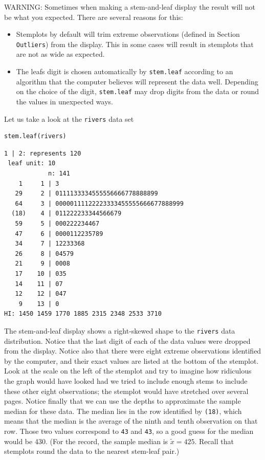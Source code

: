 \documentclass[10pt,english]{scrbook}
\begin{document}
WARNING: Sometimes when making a stem-and-leaf display the result will not be what you expected. There are several reasons for this: 
\begin{itemize}
\item Stemplots by default will trim extreme observations (defined in Section \texttt{Outliers}) from the display. This in some cases will result in stemplots that are not as wide as expected.
\item The leafs digit is chosen automatically by \texttt{stem.leaf} according to an algorithm that the computer believes will represent the data well. Depending on the choice of the digit, \texttt{stem.leaf} may drop digits from the data or round the values in unexpected ways.
\end{itemize}

Let us take a look at the \texttt{rivers} data set

\begin{verbatim}
stem.leaf(rivers)
\end{verbatim}

\begin{verbatim}
1 | 2: represents 120
 leaf unit: 10
            n: 141
    1     1 | 3
   29     2 | 0111133334555556666778888899
   64     3 | 00000111122223333455555666677888999
  (18)    4 | 011222233344566679
   59     5 | 000222234467
   47     6 | 0000112235789
   34     7 | 12233368
   26     8 | 04579
   21     9 | 0008
   17    10 | 035
   14    11 | 07
   12    12 | 047
    9    13 | 0
HI: 1450 1459 1770 1885 2315 2348 2533 3710
\end{verbatim}

The stem-and-leaf display shows a right-skewed shape to the \texttt{rivers} data distribution. Notice that the last digit of each of the data values were dropped from the display. Notice also that there were eight extreme observations identified by the computer, and their exact values are listed at the bottom of the stemplot. Look at the scale on the left of the stemplot and try to imagine how ridiculous the graph would have looked had we tried to include enough stems to include these other eight observations; the stemplot would have stretched over several pages. Notice finally that we can use the depths to approximate the sample median for these data. The median lies in the row identified by \texttt{(18)}, which means that the median is the average of the ninth and tenth observation on that row. Those two values correspond to \texttt{43} and \texttt{43}, so a good guess for the median would be 430. (For the record, the sample median is \(\widetilde{x}=425\). Recall that stemplots round the data to the nearest stem-leaf pair.) 
\end{document}
